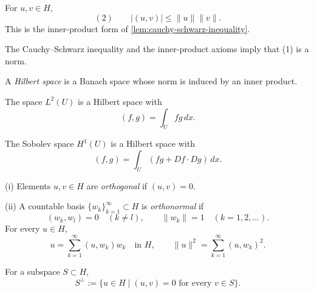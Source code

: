 \begin{lemma}
\label{lem:cauchy-schwarz-inequality-hilbert}
For $u,v\in H$,
\[
(2)\qquad |(u,v)|\leq\|u\|\|v\|.
\]
This is the inner-product form of \cref{lem:cauchy-schwarz-inequality}.
\end{lemma}

The Cauchy--Schwarz inequality and the inner-product axioms imply that (1) is a norm.

\begin{definition}
\label{def:hilbert-space}
A \textit{Hilbert space} is a Banach space whose norm is induced by an inner product.
\end{definition}

\begin{example}
\label{ex:l2-hilbert-space-example}
The space $L^2(U)$ is a Hilbert space with
\[
(f,g)=\int_Ufg\,dx.
\]
\end{example}

\begin{example}
\label{ex:h1-hilbert-space-example}
The Sobolev space $H^1(U)$ is a Hilbert space with
\[
(f,g)=\int_U(fg+Df\cdot Dg)\,dx.
\]
\end{example}

\begin{definition}
\label{def:orthogonal-orthonormal-basis}
(i) Elements $u,v\in H$ are \textit{orthogonal} if $(u,v)=0$.

(ii) A countable basis $\{w_k\}_{k=1}^\infty\subset H$ is \textit{orthonormal} if
\[
(w_k,w_l)=0\quad(k\ne l),
\qquad
\|w_k\|=1\quad(k=1,2,\ldots).
\]
For every $u\in H$,
\[
u=\sum_{k=1}^\infty(u,w_k)w_k
\quad\text{in }H,
\qquad
\|u\|^2=\sum_{k=1}^\infty(u,w_k)^2.
\]
\end{definition}

\begin{definition}
\label{def:orthogonal-complement-subspace}
For a subspace $S\subset H$,
\[
S^\perp:=\{u\in H\mid(u,v)=0\text{ for every }v\in S\}.
\]
\end{definition}

